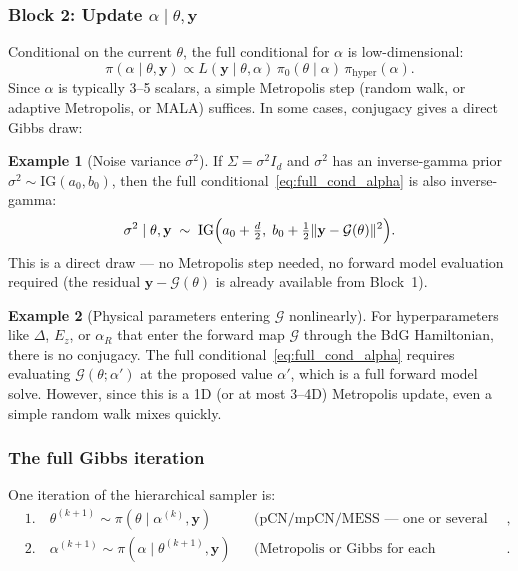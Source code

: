 \documentclass[11pt]{article}
\newcommand{\cG}{\mathcal{G}}
\theoremstyle{plain}
\theoremstyle{remark}
\theoremstyle{definition}
\newtheorem{example}{Example}
\begin{document}
\subsubsection{Block 2: Update $\alpha \mid \theta, \mathbf{y}$}

Conditional on the current $\theta$, the full conditional for $\alpha$ is 
low-dimensional:
\begin{equation}\label{eq:full_cond_alpha}
\pi(\alpha \mid \theta, \mathbf{y}) \propto 
L(\mathbf{y} \mid \theta, \alpha)\,\pi_0(\theta \mid \alpha)\,
\pi_{\text{hyper}}(\alpha).
\end{equation}
Since $\alpha$ is typically 3--5 scalars, a simple Metropolis step (random 
walk, or adaptive Metropolis, or MALA) suffices. In some cases, conjugacy 
gives a direct Gibbs draw:

\begin{example}[Noise variance $\sigma^2$]
If $\Sigma = \sigma^2 I_d$ and $\sigma^2$ has an inverse-gamma prior 
$\sigma^2 \sim \text{IG}(a_0, b_0)$, then the full 
conditional~\eqref{eq:full_cond_alpha} is also inverse-gamma:
\[
\sigma^2 \mid \theta, \mathbf{y} \;\sim\; 
\text{IG}\Bigl(a_0 + \tfrac{d}{2},\; 
b_0 + \tfrac{1}{2}\|\mathbf{y} - \cG(\theta)\|^2\Bigr).
\]
This is a direct draw --- no Metropolis step needed, no forward model 
evaluation required (the residual $\mathbf{y} - \cG(\theta)$ is already 
available from Block~1).
\end{example}

\begin{example}[Physical parameters entering $\cG$ nonlinearly]
For hyperparameters like $\Delta$, $E_z$, or $\alpha_R$ that enter the 
forward map $\cG$ through the BdG Hamiltonian, there is no conjugacy. 
The full conditional~\eqref{eq:full_cond_alpha} requires evaluating 
$\cG(\theta; \alpha')$ at the proposed value $\alpha'$, which is a full 
forward model solve. However, since this is a 1D (or at most 3--4D) 
Metropolis update, even a simple random walk mixes quickly.
\end{example}

\subsubsection{The full Gibbs iteration}

One iteration of the hierarchical sampler is:
\begin{equation}\label{eq:gibbs_iteration}
\boxed{
\begin{aligned}
&\text{1.}\quad \theta^{(k+1)} \sim \pi(\theta \mid \alpha^{(k)}, \mathbf{y})
  &&\text{(pCN/mpCN/MESS --- one or several steps)}, \\
&\text{2.}\quad \alpha^{(k+1)} \sim \pi(\alpha \mid \theta^{(k+1)}, \mathbf{y})
  &&\text{(Metropolis or Gibbs for each component)}.
\end{aligned}
}
\end{equation}
\end{document}
